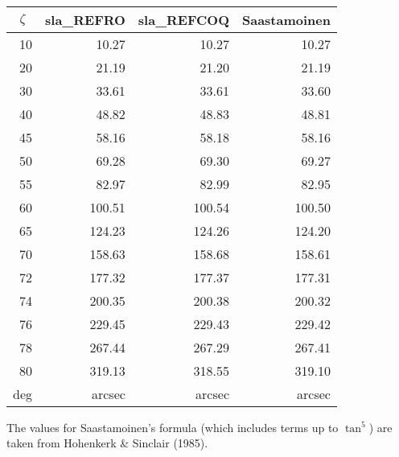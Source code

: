 \documentclass[11pt,twoside,nolof]{starlink}
\begin{document}
{\begin{enumerate}
        ~~~~~~~~~~
        \begin{tabular}{|r|r|r|r|} \hline
        \multicolumn{1}{|c}{$\zeta$} &
        \multicolumn{1}{|c}{sla\_REFRO} &
        \multicolumn{1}{|c}{sla\_REFCOQ} &
        \multicolumn{1}{|c|}{Saastamoinen} \\ \hline
        10 &  10.27 &  10.27 &  10.27 \\
        20 &  21.19 &  21.20 &  21.19 \\
        30 &  33.61 &  33.61 &  33.60 \\
        40 &  48.82 &  48.83 &  48.81 \\
        45 &  58.16 &  58.18 &  58.16 \\
        50 &  69.28 &  69.30 &  69.27 \\
        55 &  82.97 &  82.99 &  82.95 \\
        60 & 100.51 & 100.54 & 100.50 \\
        65 & 124.23 & 124.26 & 124.20 \\
        70 & 158.63 & 158.68 & 158.61 \\
        72 & 177.32 & 177.37 & 177.31 \\
        74 & 200.35 & 200.38 & 200.32 \\
        76 & 229.45 & 229.43 & 229.42 \\
        78 & 267.44 & 267.29 & 267.41 \\
        80 & 319.13 & 318.55 & 319.10 \\ \hline
        deg & arcsec & arcsec & arcsec \\ \hline
        \end{tabular}

        \vspace{3ex}

        The values for Saastamoinen's formula (which includes terms
        up to $\tan^5$) are taken from Hohenkerk \& Sinclair (1985).


\end{enumerate}}
\end{document}
